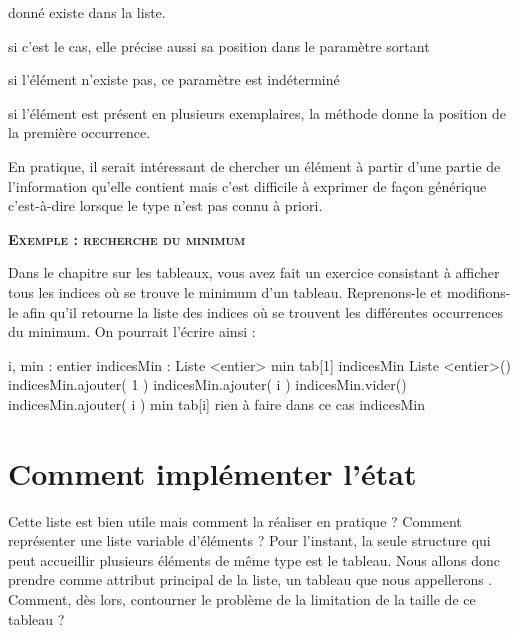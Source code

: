 \begin{liste}
		donné existe dans la liste. 
		\begin{liste}
			\item 
				si c’est le cas, elle précise aussi sa position dans le paramètre sortant 
			\item 
				si l’élément n’existe pas, ce paramètre est	indéterminé 
			\item 
				si l’élément est présent en plusieurs exemplaires, la méthode donne la
				position de la première occurrence.
		\end{liste}
	\item 
		En pratique, il serait intéressant de chercher un élément à partir d’une
		partie de l’information qu’elle contient mais c’est difficile à
		exprimer de façon générique c'est-à-dire lorsque le
		type n'est pas connu à priori.
\end{liste}

\bigskip

{\sffamily\bfseries\scshape
Exemple : recherche du minimum}

Dans le chapitre sur les tableaux, vous avez fait un exercice consistant
à afficher tous les indices où se trouve le minimum d’un tableau.
Reprenons-le et modifions-le afin qu’il retourne la liste des indices
où se trouvent les différentes occurrences du minimum. On pourrait
l’écrire ainsi :

\begin{Pseudocode}
\footnotesize
		\Decl i, min : entier
		\Decl indicesMin : Liste <entier>
		\Let min \Gets tab[1]
		\Let indicesMin \Gets {} Liste <entier>()
		\Stmt indicesMin.ajouter( 1 )
			\Switch{} 
					\Stmt indicesMin.ajouter( i )
					\Stmt indicesMin.vider() 
					\Stmt indicesMin.ajouter( i )
					\Let min \Gets tab[i]
					\LComment rien à faire dans ce cas	
			\EndSwitch
		\EndFor
		\Return indicesMin
	\EndModule
\end{Pseudocode}

\bigskip

\section{Comment implémenter l’état}

Cette liste est bien utile mais comment la réaliser en pratique ?
Comment représenter une liste variable d’éléments ? Pour
l'instant, la seule structure qui peut accueillir
plusieurs éléments de même type est le tableau. Nous allons donc
prendre comme attribut principal de la liste, un tableau que nous
appellerons . Comment, dès lors, contourner
le problème de la limitation de la taille de ce tableau ?

